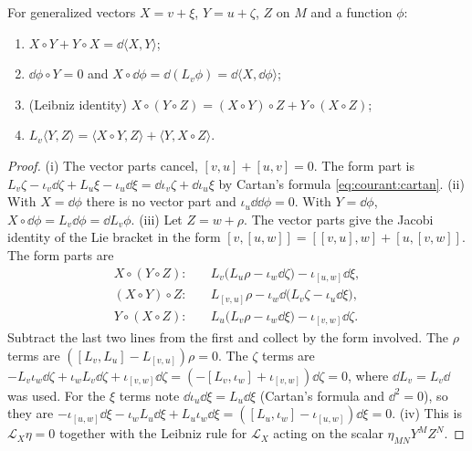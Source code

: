 \begin{proposition}\label{prop:courant:dorfman}
For generalized vectors $X=v+\xi$, $Y=u+\zeta$, $Z$ on $M$ and a function $\phi$:
\begin{enumerate}[label=(\roman*),nosep]
\item $X\circ Y+Y\circ X=\dd\langle X,Y\rangle$;
\item $\dd\phi\circ Y=0$ and $X\circ\dd\phi=\dd(L_v\phi)=\dd\langle X,\dd\phi\rangle$;
\item (Leibniz identity) $X\circ(Y\circ Z)=(X\circ Y)\circ Z+Y\circ(X\circ Z)$;
\item $L_v\langle Y,Z\rangle=\langle X\circ Y,Z\rangle+\langle Y,X\circ Z\rangle$.
\end{enumerate}
\end{proposition}
\begin{proof}
(i) The vector parts cancel, $[v,u]+[u,v]=0$. The form part is
$L_v\zeta-\iota_v\dd\zeta+L_u\xi-\iota_u\dd\xi=\dd\iota_v\zeta+\dd\iota_u\xi$ by Cartan's formula
\eqref{eq:courant:cartan}.
(ii) With $X=\dd\phi$ there is no vector part and $\iota_u\dd\dd\phi=0$. With $Y=\dd\phi$,
$X\circ\dd\phi=L_v\dd\phi=\dd L_v\phi$.
(iii) Let $Z=w+\rho$. The vector parts give the Jacobi identity of the Lie bracket in the form
$[v,[u,w]]=[[v,u],w]+[u,[v,w]]$. The form parts are
\begin{align*}
X\circ(Y\circ Z):&\quad L_v\bigl(L_u\rho-\iota_w\dd\zeta\bigr)-\iota_{[u,w]}\dd\xi,\\
(X\circ Y)\circ Z:&\quad L_{[v,u]}\rho-\iota_w\dd\bigl(L_v\zeta-\iota_u\dd\xi\bigr),\\
Y\circ(X\circ Z):&\quad L_u\bigl(L_v\rho-\iota_w\dd\xi\bigr)-\iota_{[v,w]}\dd\zeta .
\end{align*}
Subtract the last two lines from the first and collect by the form involved. The $\rho$ terms are
$([L_v,L_u]-L_{[v,u]})\rho=0$. The $\zeta$ terms are
$-L_v\iota_w\dd\zeta+\iota_wL_v\dd\zeta+\iota_{[v,w]}\dd\zeta
=(-[L_v,\iota_w]+\iota_{[v,w]})\dd\zeta=0$, where $\dd L_v=L_v\dd$ was used. For the $\xi$ terms
note $\dd\iota_u\dd\xi=L_u\dd\xi$ (Cartan's formula and $\dd^2=0$), so they are
$-\iota_{[u,w]}\dd\xi-\iota_wL_u\dd\xi+L_u\iota_w\dd\xi=([L_u,\iota_w]-\iota_{[u,w]})\dd\xi=0$.
(iv) This is $\mathcal L_X\eta=0$ together with the Leibniz rule for $\mathcal L_X$ acting on the
scalar $\eta_{MN}Y^MZ^N$.
\end{proof}

